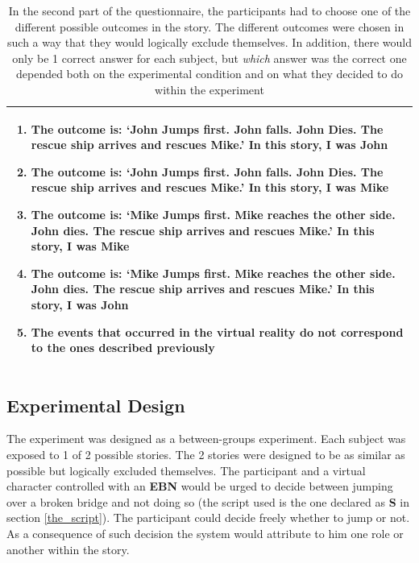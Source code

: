 \documentclass[
		twoside,openright,titlepage,numbers=noenddot,manychapters,
		headinclude,%
                footinclude=false,cleardoublepage=empty,
                BCOR=5mm,
		fontsize=11pt, %
                 enabledeprecatedfontcommands]{scrreprt}
\begin{document}
\begin{table}[t]
\caption{  In the second part of the questionnaire, the participants had to choose one of the different possible outcomes in the story. The different outcomes were chosen in such a way that they would logically exclude themselves. In addition, there would only be 1 correct answer for each subject, but \emph{which} answer was the correct one depended both on the experimental condition and on what they decided to do within the experiment }
\centering
\begin{tabular*}{1.0\textwidth}{ p{}  }
\\
\hline\hline
\begin{enumerate}
\item The outcome is:  `\textbf{John Jumps first. John falls. John Dies. The rescue ship arrives and rescues Mike.}' In this story, I was \textbf{John}
\item The outcome is: `\textbf{John Jumps first. John falls. John Dies. The rescue ship arrives and rescues Mike.}' In this story, I was \textbf{Mike}
\item The outcome is: `\textbf{Mike Jumps first. Mike reaches the other side. John dies. The rescue ship arrives and rescues Mike.}' In this story, I was \textbf{Mike}
\item The outcome is:  `\textbf{Mike Jumps first. Mike reaches the other side. John dies. The rescue ship arrives and rescues Mike.}' In this story, I was \textbf{John}
\item The events that occurred in the virtual reality do not correspond to the ones described previously
\end{enumerate}
 \\[1ex]
\hline
\end{tabular*}
\label{table_q_story}
\end{table}


\subsection{Experimental Design}
The experiment was designed as a between-groups experiment. Each subject was exposed to 1 of 2 possible stories. The 2 stories were designed to be as similar as possible but logically excluded themselves. The participant and a virtual character controlled with an \textbf{EBN} would be urged to decide between jumping over a broken bridge and not doing so (the script used is the one declared as \textbf{S} in section \ref{the_script}). The participant could decide freely whether to jump or not. As a consequence of such decision the system would attribute to him one role or another within the story. 
\end{document}
